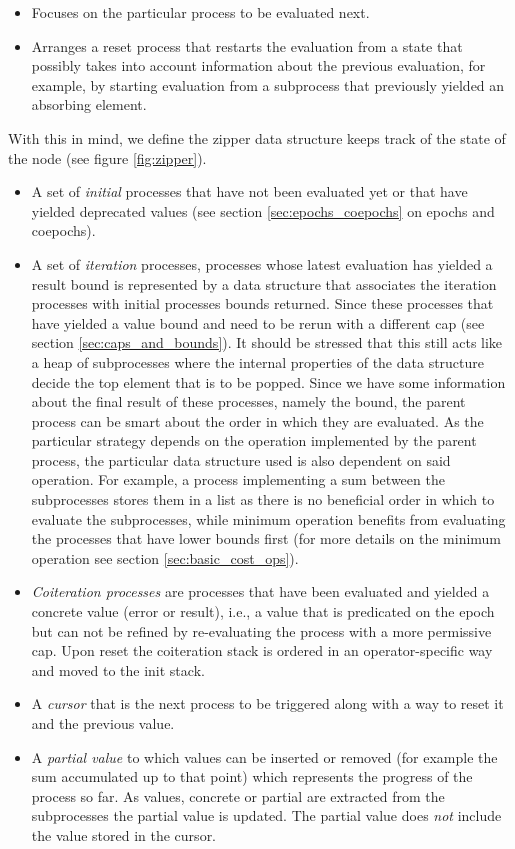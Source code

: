 \begin{itemize}
\item Focuses on the particular process to be evaluated next.
\item Arranges a reset process that restarts the evaluation from a
  state that possibly takes into account information about the
  previous evaluation, for example, by starting evaluation from a
  subprocess that previously yielded an absorbing element.
\end{itemize}

With this in mind, we define the zipper data structure keeps track of
the state of the node (see figure \ref{fig:zipper}).

\begin{itemize}
\item A set of \emph{initial} processes that have not been evaluated
  yet or that have yielded deprecated values (see section
  \ref{sec:epochs_coepochs} on epochs and coepochs).
\item A set of \emph{iteration} processes, processes whose latest
  evaluation has yielded a result bound is represented by a data
  structure that associates the iteration processes with initial
  processes bounds returned. Since these processes that have yielded a
  value bound and need to be rerun with a different cap (see section
  \ref{sec:caps_and_bounds}). It should be stressed that this still
  acts like a heap of subprocesses where the internal properties of
  the data structure decide the top element that is to be
  popped. Since we have some information about the final result of
  these processes, namely the bound, the parent process can be smart
  about the order in which they are evaluated. As the particular
  strategy depends on the operation implemented by the parent process,
  the particular data structure used is also dependent on said
  operation. For example, a process implementing a sum between the
  subprocesses stores them in a list as there is no beneficial order
  in which to evaluate the subprocesses, while minimum operation
  benefits from evaluating the processes that have lower bounds first
  (for more details on the minimum operation see section
  \ref{sec:basic_cost_ops}).

\item \emph{Coiteration processes} are processes that have been
  evaluated and yielded a concrete value (error or result), i.e., a
  value that is predicated on the epoch but can not be refined by
  re-evaluating the process with a more permissive cap. Upon reset the
  coiteration stack is ordered in an operator-specific way and moved
  to the init stack.
\item A \emph{cursor} that is the next process to be triggered along
  with a way to reset it and the previous value.
\item A \emph{partial value} to which values can be inserted or
  removed (for example the sum accumulated up to that point) which
  represents the progress of the process so far. As values, concrete
  or partial are extracted from the subprocesses the partial value is
  updated. The partial value does \emph{not} include the value stored
  in the cursor.
\end{itemize}

